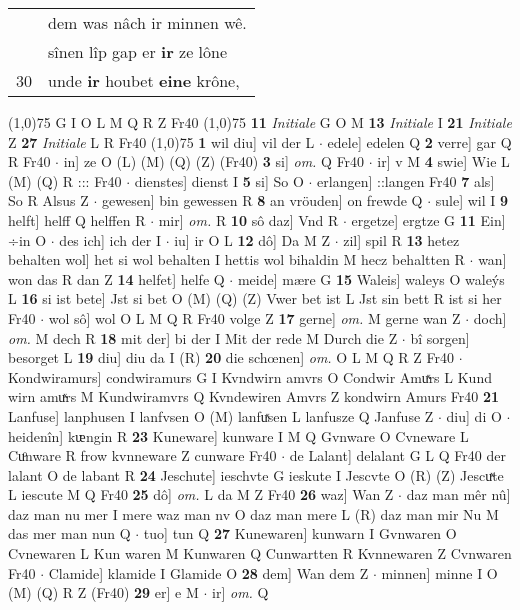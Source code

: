 \documentclass[8pt,a4paper,notitlepage]{article}
\begin{document}
\begin{table}[ht]
\begin{minipage}[t]{0.5\linewidth}
\begin{tabular}{rl}
 & dem was nâch ir minnen wê.\\ 
 & sînen lîp gap er \textbf{ir} ze lône\\ 
30 & unde \textbf{ir} houbet \textbf{eine} krône,\\ 
\end{tabular}
\scriptsize
\line(1,0){75} \newline
G I O L M Q R Z Fr40 \newline
\line(1,0){75} \newline
\textbf{11} \textit{Initiale} G O M  \textbf{13} \textit{Initiale} I  \textbf{21} \textit{Initiale} Z  \textbf{27} \textit{Initiale} L R Fr40  \newline
\line(1,0){75} \newline
\textbf{1} wil diu] vil der L  $\cdot$ edele] edelen Q \textbf{2} verre] gar Q R Fr40  $\cdot$ in] ze O (L) (M) (Q) (Z) (Fr40) \textbf{3} si] \textit{om.} Q Fr40  $\cdot$ ir] v M \textbf{4} swie] Wie L (M) (Q) R ::: Fr40  $\cdot$ dienstes] dienst I \textbf{5} si] So O  $\cdot$ erlangen] ::langen Fr40 \textbf{7} als] So R Alsus Z  $\cdot$ gewesen] bin gewessen R \textbf{8} an vröuden] on frewde Q  $\cdot$ sule] wil I \textbf{9} helft] helff Q helffen R  $\cdot$ mir] \textit{om.} R \textbf{10} sô daz] Vnd R  $\cdot$ ergetze] ergtze G \textbf{11} Ein] ÷in O  $\cdot$ des ich] ich der I  $\cdot$ iu] ir O L \textbf{12} dô] Da M Z  $\cdot$ zil] spil R \textbf{13} hetez behalten wol] het si wol behalten I hettis wol bihaldin M hecz behaltten R  $\cdot$ wan] won das R dan Z \textbf{14} helfet] helfe Q  $\cdot$ meide] mære G \textbf{15} Waleis] waleys O waleýs L \textbf{16} si ist bete] Jst si bet O (M) (Q) (Z) Vwer bet ist L Jst sin bett R ist si her Fr40  $\cdot$ wol sô] wol O L M Q R Fr40 volge Z \textbf{17} gerne] \textit{om.} M gerne wan Z  $\cdot$ doch] \textit{om.} M dech R \textbf{18} mit der] bi der I Mit der rede M Durch die Z  $\cdot$ bî sorgen] besorget L \textbf{19} diu] diu da I (R) \textbf{20} die schœnen] \textit{om.} O L M Q R Z Fr40  $\cdot$ Kondwiramurs] condwiramurs G I Kvndwirn amvrs O Condwir Amuͯrs L Kund wirn amuͯrs M Kundwiramvrs Q Kvndewiren Amvrs Z kondwirn Amurs Fr40 \textbf{21} Lanfuse] lanphusen I lanfvsen O (M) lanfuͯsen L lanfusze Q Janfuse Z  $\cdot$ diu] di O  $\cdot$ heidenîn] kᵫngin R \textbf{23} Kuneware] kunware I M Q Gvnware O Cvneware L Cuͦnware R frow kvnneware Z cunware Fr40  $\cdot$ de Lalant] delalant G L Q Fr40 der lalant O de labant R \textbf{24} Jeschute] ieschvte G ieskute I Jescvte O (R) (Z) Jescuͯte L iescute M Q Fr40 \textbf{25} dô] \textit{om.} L da M Z Fr40 \textbf{26} waz] Wan Z  $\cdot$ daz man mêr nû] daz man nu mer I mere waz man nv O daz man mere L (R) daz man mir Nu M das mer man nun Q  $\cdot$ tuo] tun Q \textbf{27} Kunewaren] kunwarn I Gvnwaren O Cvnewaren L Kun waren M Kunwaren Q Cunwartten R Kvnnewaren Z Cvnwaren Fr40  $\cdot$ Clamide] klamide I Glamide O \textbf{28} dem] Wan dem Z  $\cdot$ minnen] minne I O (M) (Q) R Z (Fr40) \textbf{29} er] e M  $\cdot$ ir] \textit{om.} Q \newline

\end{minipage}
\end{table}
\end{document}
